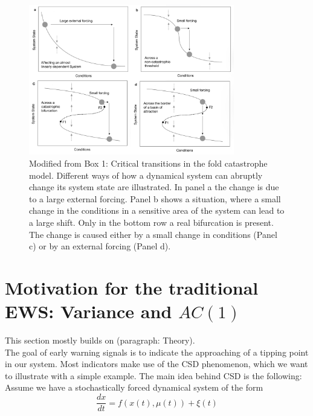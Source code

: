 \documentclass[%
thesis=student,%
coverpage=false,%
titlepage=false,%
headmarks=true, %
english,%
font=libertine, %
math=newpxtx, %
BCOR=5mm,%
coverBCOR=11mm%
]{tumbook}
\begin{document}
\begin{figure}[t]
    \centering
    \includegraphics[width=0.8\textwidth]{bachelor-thesis/figures/scheffer_box_1.jpg}
    \caption{Modified from \cite{Scheffer:2009} Box 1: Critical transitions in the fold catastrophe model. Different ways of how a dynamical system can abruptly change its system state are illustrated. In panel a the change is due to a large external forcing. Panel b shows a situation, where a small change in the conditions in a sensitive area of the system can lead to a large shift. Only in the bottom row a real bifurcation is present. The change is caused either by a small change in conditions (Panel c) or by an external forcing (Panel d).}
    \label{fig:Critical transitions in the fold catastrophe mode}
\end{figure}


\section{Motivation for the traditional EWS: Variance and $AC(1)$}
\label{sec: Motivation for the traditional EWS: Variance and $AC(1)$}

This section mostly builds on \cite{Scheffer:2009}(paragraph: Theory).\\
The goal of early warning signals is to indicate the approaching of a tipping point in our system. Most indicators make use of the CSD phenomenon, which we want to illustrate with a simple example. The main idea behind CSD is the following: Assume we have a stochastically forced dynamical system of the form 
\begin{equation}
    \frac{dx}{dt} = f(x(t),\mu(t)) + \xi (t) 
    \label{stochastically forced system}
\end{equation}
\end{document}
